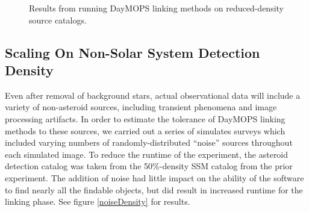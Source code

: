 \documentclass[12pt,preprint]{aastex}
\begin{document}
\begin{figure}


\caption{ Results from running DayMOPS linking methods on reduced-density source catalogs. }

\label{ssmDensity}

\end{figure}














\subsection{Scaling On Non-Solar System Detection Density}

Even after removal of background stars, actual observational data will
include a variety of non-asteroid sources, including transient
phenomena and image processing artifacts.  In order to estimate the
tolerance of DayMOPS linking methods to these sources, we carried out
a series of simulates surveys which included varying numbers of
randomly-distributed ``noise'' sources throughout each simulated
image.  To reduce the runtime of the experiment, the asteroid
detection catalog was taken from the 50\%-density SSM catalog from the
prior experiment.  The addition of noise had little impact on the
ability of the software to find nearly all the findable objects, but
did result in increased runtime for the linking phase.  See figure
\ref{noiseDensity} for results.
\end{document}
